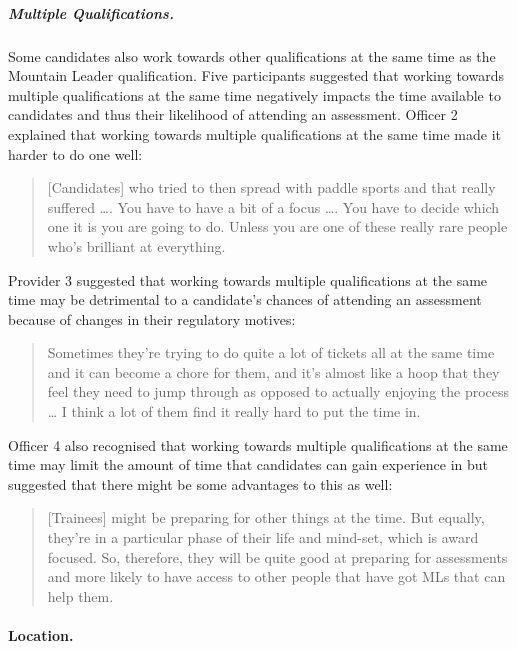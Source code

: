 \documentclass[
  12pt,
  a4paper,
]{book}
\begin{document}
\hypertarget{multiple-qualifications.}{%
\subparagraph{Multiple Qualifications.}\label{multiple-qualifications.}}

Some candidates also work towards other qualifications at the same time as the Mountain Leader qualification. Five participants suggested that working towards multiple qualifications at the same time negatively impacts the time available to candidates and thus their likelihood of attending an assessment. Officer 2 explained that working towards multiple qualifications at the same time made it harder to do one well:

\begin{quote}
{[}Candidates{]} who tried to then spread with paddle sports and that really suffered \ldots. You have to have a bit of a focus \ldots. You have to decide which one it is you are going to do. Unless you are one of these really rare people who's brilliant at everything.
\end{quote}

Provider 3 suggested that working towards multiple qualifications at the same time may be detrimental to a candidate's chances of attending an assessment because of changes in their regulatory motives:

\begin{quote}
Sometimes they're trying to do quite a lot of tickets all at the same time and it can become a chore for them, and it's almost like a hoop that they feel they need to jump through as opposed to actually enjoying the process \ldots{} I think a lot of them find it really hard to put the time in.
\end{quote}

Officer 4 also recognised that working towards multiple qualifications at the same time may limit the amount of time that candidates can gain experience in but suggested that there might be some advantages to this as well:

\begin{quote}
{[}Trainees{]} might be preparing for other things at the time. But equally, they're in a particular phase of their life and mind-set, which is award focused. So, therefore, they will be quite good at preparing for assessments and more likely to have access to other people that have got MLs that can help them.
\end{quote}

\hypertarget{qual-gta-location}{%
\paragraph{Location.}\label{qual-gta-location}}
\end{document}
